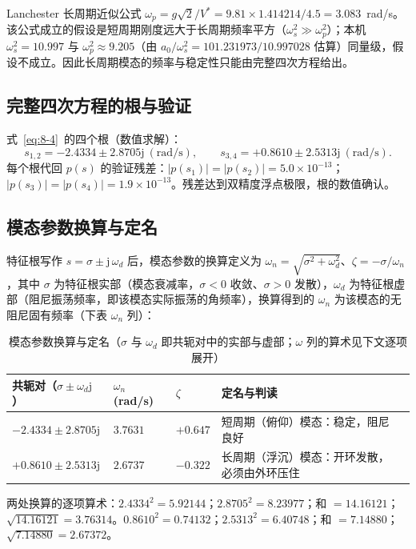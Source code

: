 \documentclass[11pt,a4paper]{ctexart}
\begin{document}
Lanchester 长周期近似公式 $\omega_p = g\sqrt{2}/V^{*} = 9.81\times 1.414214/4.5 = 3.083$~rad/s。该公式成立的假设是短周期刚度远大于长周期频率平方（$\omega_s^2\gg\omega_p^2$）；本机 $\omega_s^2=10.997$ 与 $\omega_p^2\approx 9.205$（由 $a_0/\omega_s^2 = 101.231973/10.997028$ 估算）同量级，假设不成立。因此长周期模态的频率与稳定性只能由完整四次方程给出。

\subsection{完整四次方程的根与验证}

式~\eqref{eq:8-4}~的四个根（数值求解）：
\begin{equation}\label{eq:9-4}
s_{1,2} = -2.4334 \pm 2.8705\mathrm{j}\ \mathrm{(rad/s)},
\qquad
s_{3,4} = +0.8610 \pm 2.5313\mathrm{j}\ \mathrm{(rad/s)}.
\tag{(9-4)}
\end{equation}
每个根代回 $p(s)$ 的验证残差：$|p(s_1)|=|p(s_2)|=5.0\times10^{-13}$；$|p(s_3)|=|p(s_4)|=1.9\times10^{-13}$。残差达到双精度浮点极限，根的数值确认。

\subsection{模态参数换算与定名}

特征根写作 $s=\sigma\pm\mathrm{j}\,\omega_d$ 后，模态参数的换算定义为 $\omega_n=\sqrt{\sigma^2+\omega_d^2}$、$\zeta=-\sigma/\omega_n$，其中 $\sigma$ 为特征根实部（模态衰减率，$\sigma<0$ 收敛、$\sigma>0$ 发散），$\omega_d$ 为特征根虚部（阻尼振荡频率，即该模态实际振荡的角频率），换算得到的 $\omega_n$ 为该模态的无阻尼固有频率（下表 $\omega_n$ 列）：

\begin{table}[htbp]
\centering\small
\begin{tabularx}{\textwidth}{llllX}
\toprule
共轭对（$\sigma\pm\omega_d\mathrm{j}$） & $\omega_n$ (rad/s) & $\zeta$ & 定名与判读 \\
\midrule
$-2.4334\pm 2.8705\mathrm{j}$ & $3.7631$ & $+0.647$ & 短周期（俯仰）模态：稳定，阻尼良好 \\
$+0.8610\pm 2.5313\mathrm{j}$ & $2.6737$ & $-0.322$ & 长周期（浮沉）模态：开环发散，必须由外环压住 \\
\bottomrule
\end{tabularx}
\caption{模态参数换算与定名（$\sigma$ 与 $\omega_d$ 即共轭对中的实部与虚部；$\omega$ 列的算术见下文逐项展开）}
\end{table}

两处换算的逐项算术：$2.4334^2=5.92144$；$2.8705^2=8.23977$；和 $=14.16121$；$\sqrt{14.16121}=3.76314$。$0.8610^2=0.74132$；$2.5313^2=6.40748$；和 $=7.14880$；$\sqrt{7.14880}=2.67372$。
\end{document}
